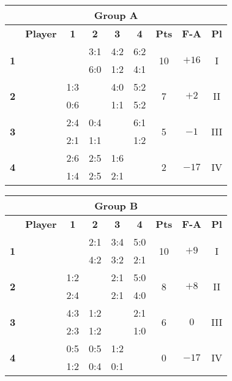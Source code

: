 \documentclass[10pt]{article}
\newcommand{\red}{\color{red}}
\newcommand{\blue}{\color{blue}}
\newcommand{\blank}{\cellcolor[gray]{.5}}
\begin{document}
\vspace{1cm}
\hspace{-5cm}
\begin{tabular}{|c|p{2.8cm}|c|c|c|c|c|c|c|}
	\multicolumn{9}{c}{\bf Group A} \\ \hline
	& \bf Player & \bf1 & \bf2 & \bf3 & \bf4 & \bf Pts & \bf F-A & \bf Pl \\ \hline
	\multirow{2}{*}{\bf1}&\multirow{2}{*}{}      & \blank & \red3:1 & \red4:2 & \red6:2 &\multirow{2}{*}{10}&\multirow{2}{*}{$+16$}&\multirow{2}{*}{I} \\ && \blank & \red6:0 & \blue1:2 & \red4:1 &&& \\ \hline
	\multirow{2}{*}{\bf2}&\multirow{2}{*}{}        & \blue1:3 & \blank & \red4:0 & \red5:2 &\multirow{2}{*}{7}&\multirow{2}{*}{$+2$}&\multirow{2}{*}{II} \\      && \blue0:6 & \blank & 1:1 & \red5:2 &&& \\ \hline
	\multirow{2}{*}{\bf3}&\multirow{2}{*}{}& \blue2:4 & \blue0:4 & \blank & \red6:1 &\multirow{2}{*}{5}&\multirow{2}{*}{$-1$}&\multirow{2}{*}{III} \\     && \red2:1 & 1:1 & \blank & \blue1:2 &&& \\ \hline
	\multirow{2}{*}{\bf4}&\multirow{2}{*}{}     & \blue2:6 & \blue2:5 & \blue1:6 & \blank &\multirow{2}{*}{2}&\multirow{2}{*}{$-17$}&\multirow{2}{*}{IV} \\     && \blue1:4 & \blue2:5 & \red2:1 & \blank &&& \\ \hline
\end{tabular}
\hspace{0.2cm}
\begin{tabular}{|c|p{2.8cm}|c|c|c|c|c|c|c|}
	\multicolumn{9}{c}{\bf Group B} \\ \hline
	& \bf Player & \bf1 & \bf2 & \bf3 & \bf4 & \bf Pts & \bf F-A & \bf Pl \\ \hline
	\multirow{2}{*}{\bf1}&\multirow{2}{*}{}  & \blank & \red2:1 & \blue3:4 & \red5:0 &\multirow{2}{*}{10}&\multirow{2}{*}{$+9$}&\multirow{2}{*}{I} \\  && \blank & \red4:2 & \red3:2 & \red2:1 &&& \\ \hline
	\multirow{2}{*}{\bf2}&\multirow{2}{*}{}& \blue1:2 & \blank & \red2:1 & \red5:0 &\multirow{2}{*}{8}&\multirow{2}{*}{$+8$}&\multirow{2}{*}{II} \\  && \blue2:4 & \blank & \red2:1 & \red4:0 &&& \\ \hline
	\multirow{2}{*}{\bf3}&\multirow{2}{*}{} & \red4:3 & \blue1:2 & \blank & \red2:1 &\multirow{2}{*}{6}&\multirow{2}{*}{$0$}&\multirow{2}{*}{III} \\  && \blue2:3 & \blue1:2 & \blank & \red1:0 &&& \\ \hline
	\multirow{2}{*}{\bf4}&\multirow{2}{*}{}  & \blue0:5 & \blue0:5 & \blue1:2 & \blank &\multirow{2}{*}{0}&\multirow{2}{*}{$-17$}&\multirow{2}{*}{IV} \\ && \blue1:2 & \blue0:4 & \blue0:1 & \blank &&& \\ \hline
\end{tabular}
\hspace{-5cm}
\end{document}
